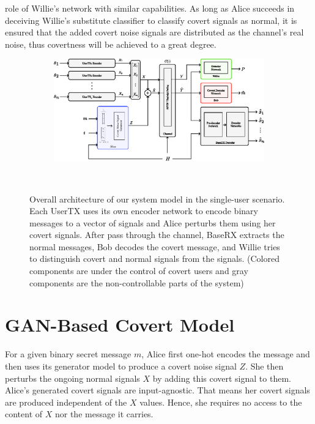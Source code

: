 role of Willie's network with similar capabilities. As long as Alice succeeds in deceiving Willie's substitute classifier to classify covert signals as normal, it is ensured that the added covert noise signals are distributed as the channel's real noise, thus covertness will be achieved to a great degree.


\begin{figure}[thp]
	\center
	\begin{subfigure}{0.7\textwidth}
		\includegraphics[width=\linewidth]{figs/multi_system_architecture}
	\end{subfigure}
	\\
	\caption{Overall architecture of our system model in the single-user scenario. Each UserTX uses its own encoder network to encode binary messages to a vector of signals and Alice perturbs them using her covert signals. After pass through the channel, BaseRX extracts the normal messages, Bob decodes the covert message, and Willie tries to distinguish covert and normal signals from the signals. (Colored components are under the control of covert users and gray components are the non-controllable parts of the system)}
	\label{fig:multi_system_architecture}
\end{figure}

\section{GAN-Based Covert Model}
For a given binary secret message \(m\), Alice first one-hot encodes the message and then uses its generator model to produce a covert noise signal \(Z\). She then perturbs the ongoing normal signals \(X\) by adding this covert signal to them. Alice's generated covert signals are input-agnostic. That means her covert signals are produced independent of the \(X\) values. Hence, she requires no access to the content of \(X\) nor the message it carries. 

